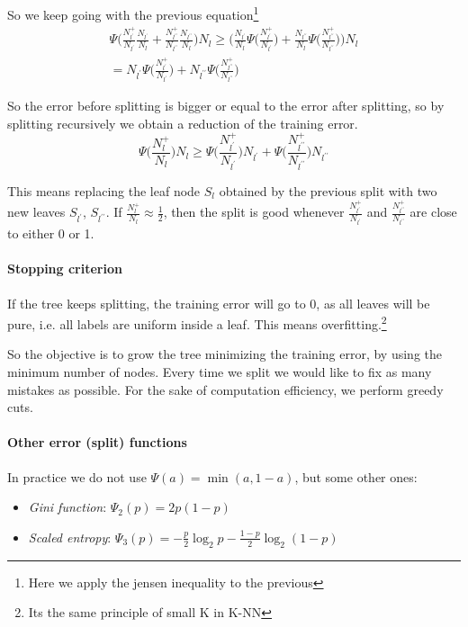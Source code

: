 So we keep going with the previous equation\footnote{Here we apply the jensen inequality
to the previous}
\begin{equation}
    \begin{aligned}
        \Psi\bigg(\frac{N_{l^\prime}^+}{N_{l^\prime}}
    \frac{N_{l^\prime}}{N_l}+\frac{N_{l^{\prime\prime}}^+}{N_{l^{\prime\prime}}}
    \frac{N_{l^{\prime\prime}}}{N_l}
    \bigg)N_l \geq 
    \bigg(\frac{N_{l^\prime}}{N_l}\Psi\bigg(\frac{N_{l^\prime}^+}{N_{l^\prime}}
    \bigg) + \frac{N_{l^{\prime\prime}}}{N_l}\Psi\bigg(\frac{N_{l^{\prime\prime}}^+}{N_{l^{\prime\prime}}}\bigg)\bigg)N_l\\
    = N_{l^\prime}\Psi\bigg(\frac{N_{l^\prime}^+}{N_{l^\prime}}
    \bigg) + N_{l^{\prime\prime}}\Psi\bigg(\frac{N_{l^{\prime\prime}}^+}{N_{l^{\prime\prime}}}\bigg)
    \end{aligned}
\end{equation}

So the error before splitting is bigger or equal 
to the error after splitting, so by splitting recursively we 
obtain a reduction of the training error.
$$\Psi\bigg(\frac{N_l^+}{N_l}\bigg)N_l \geq 
\Psi\bigg(\frac{N_{l^\prime}^+}{N_{l^\prime}}
    \bigg)N_{l^\prime} + \Psi\bigg(\frac{N_{l^{\prime\prime}}^+}{N_{l^{\prime\prime}}}\bigg)N_{l^{\prime\prime}}$$

This means replacing the leaf node $S_l$ obtained by the previous split 
with two new leaves $S_{l^\prime}$, $S_{l^{\prime\prime}}$.
If $\frac{N_l^+}{N_l} \approx \frac{1}{2}$, then the split is good whenever 
$\frac{N_{l^\prime}^+}{N_{l^\prime}}$ and 
$\frac{N_{l^{\prime\prime}}^+}{N_{l^{\prime\prime}}}$ are close to either 0 or 1.

\paragraph{Stopping criterion}
If the tree keeps splitting, the training error will go to 0, as 
all leaves will be pure, i.e. all labels are uniform inside a leaf.
This means overfitting.\footnote{Its the same principle of small K in K-NN}

So the objective is to grow the tree minimizing the training error, by 
using the minimum number of nodes. Every time we split we would like 
to fix as many mistakes as possible. For the sake of computation efficiency, 
we perform greedy cuts.

\paragraph{Other error (split) functions}
In practice we do not use $\Psi(a) = \min(a, 1-a)$, but some other ones:
\begin{itemize}
    \item \emph{Gini function}: $\Psi_2(p) = 2p(1-p)$
    \item \emph{Scaled entropy}: $\Psi_3(p) = -\frac{p}{2}\log_2 p - \frac{1-p}{2}\log_2(1-p)$
\end{itemize}

